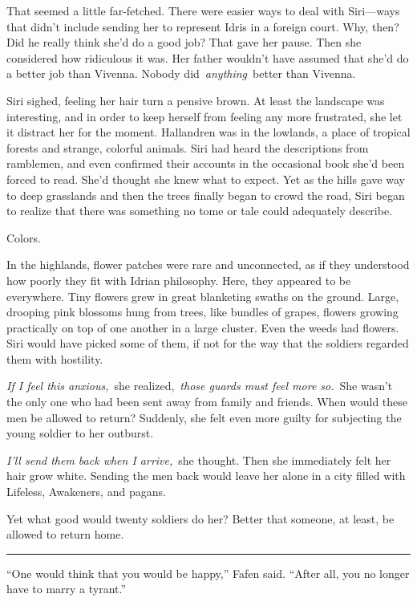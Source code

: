 That seemed a little far-fetched. There were easier ways to deal with Siri—ways that didn’t include sending her to represent Idris in a foreign court. Why, then? Did he really think she’d do a good job? That gave her pause. Then she considered how ridiculous it was. Her father wouldn’t have assumed that she’d do a better job than Vivenna. Nobody did~\textit{anything}~better than Vivenna.

Siri sighed, feeling her hair turn a pensive brown. At least the landscape was interesting, and in order to keep herself from feeling any more frustrated, she let it distract her for the moment. Hallandren was in the lowlands, a place of tropical forests and strange, colorful animals. Siri had heard the descriptions from ramblemen, and even confirmed their accounts in the occasional book she’d been forced to read. She’d thought she knew what to expect. Yet as the hills gave way to deep grasslands and then the trees finally began to crowd the road, Siri began to realize that there was something no tome or tale could adequately describe.

Colors.

In the highlands, flower patches were rare and unconnected, as if they understood how poorly they fit with Idrian philosophy. Here, they appeared to be everywhere. Tiny flowers grew in great blanketing swaths on the ground. Large, drooping pink blossoms hung from trees, like bundles of grapes, flowers growing practically on top of one another in a large cluster. Even the weeds had flowers. Siri would have picked some of them, if not for the way that the soldiers regarded them with hostility.

\textit{If I feel this anxious,}~she realized,~\textit{those guards must feel more so.}~She wasn’t the only one who had been sent away from family and friends. When would these men be allowed to return? Suddenly, she felt even more guilty for subjecting the young soldier to her outburst.

\textit{I’ll send them back when I arrive,}~she thought. Then she immediately felt her hair grow white. Sending the men back would leave her alone in a city filled with Lifeless, Awakeners, and pagans.

Yet what good would twenty soldiers do her? Better that someone, at least, be allowed to return home.

\bigskip \hrule \bigskip

“One would think that you would be happy,” Fafen said. “After all, you no longer have to marry a tyrant.”

